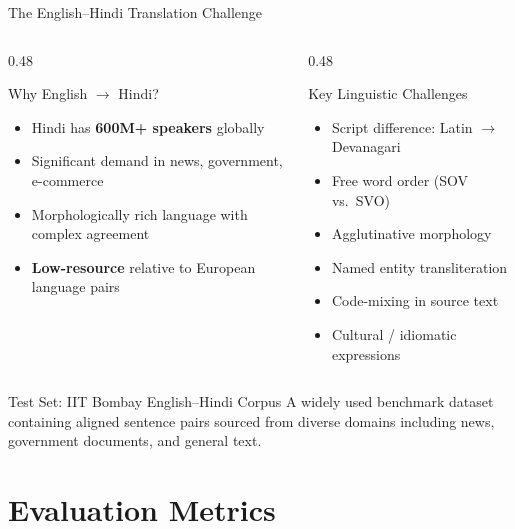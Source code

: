 \documentclass[aspectratio=169]{beamer}
\begin{document}
\begin{frame}{The English–Hindi Translation Challenge}
  \begin{columns}[T]
    \begin{column}{0.48\textwidth}
      \begin{block}{Why English $\rightarrow$ Hindi?}
        \begin{itemize}
          \item Hindi has \textbf{600M+ speakers} globally
          \item Significant demand in news, government, e-commerce
          \item Morphologically rich language with complex agreement
          \item \textbf{Low-resource} relative to European language pairs
        \end{itemize}
      \end{block}
    \end{column}
    \begin{column}{0.48\textwidth}
      \begin{alertblock}{Key Linguistic Challenges}
        \begin{itemize}
          \item Script difference: Latin $\rightarrow$ Devanagari
          \item Free word order (SOV vs.\ SVO)
          \item Agglutinative morphology
          \item Named entity transliteration
          \item Code-mixing in source text
          \item Cultural / idiomatic expressions
        \end{itemize}
      \end{alertblock}
    \end{column}
  \end{columns}
  \vspace{0.3cm}
  \begin{block}{Test Set: IIT Bombay English–Hindi Corpus}
    A widely used benchmark dataset containing aligned sentence pairs sourced from diverse domains including news, government documents, and general text.
  \end{block}
\end{frame}

\section{Evaluation Metrics}
\end{document}
